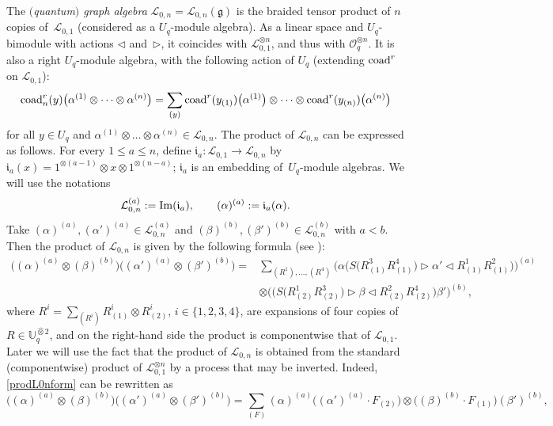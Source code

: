 \documentclass[10pt,a4paper]{amsart}
\numberwithin{equation}{section}
\theoremstyle{definition}
\newcommand{\mUq}{\mathbb{U}_q}
\newcommand{\Ll}{{\mathcal L}}
\newcommand{\Oo}{{\mathcal O}}
\newcommand{\ra}{\rightarrow}
\begin{document}
The {\it $($quantum$)$ graph algebra} $\Ll_{0,n} = \Ll_{0,n}(\mathfrak{g})$ is the braided tensor product of $n$ copies of~$\Ll_{0,1}$ (considered as a $U_q$-module algebra). As a linear space and $U_q$-bimodule with actions $\lhd$ and~$\rhd$, it coincides with $\Ll_{0,1}^{\otimes n}$, and thus with $\Oo_q^{\otimes n}$. It is also a right $U_q$-module algebra, with the following action of $U_q$ (extending ${\rm coad}^r$ on $\Ll_{0,1}$):
 \begin{gather}
{\rm coad}_n^r(y)\big(\alpha^{(1)}\otimes \dots \otimes \alpha^{(n)}\big) =
\sum_{(y)} {\rm coad}^r(y_{(1)})\big(\alpha^{(1)}\big) \otimes \dots \otimes {\rm coad}^r(y_{(n)})\big(\alpha^{(n)}\big)\label{actionprod}
\end{gather}
for all $y \in U_q$ and $\alpha^{(1)}\otimes \dots \otimes \alpha^{(n)} \in \Ll_{0,n}$. The product of $\Ll_{0,n}$ can be expressed as follows. For every $1\leq a\leq n$, define $\mathfrak{i}_a\colon \Ll_{0,1}\ra \Ll_{0,n}$ by $\mathfrak{i}_a(x) = 1^{\otimes (a-1)}\otimes x \otimes 1^{\otimes (n-a)}$; $\mathfrak{i}_a$ is an embedding of~$U_q$-module algebras. We will use the notations
\begin{equation}\label{plgtL01a}
\Ll_{0,n}^{(a)}:= {\rm Im}(\mathfrak{i}_a),\qquad (\alpha)^{(a)} := \mathfrak{i}_a(\alpha).
\end{equation}
Take $(\alpha)^{(a)},(\alpha')^{(a)} \in \Ll_{0,n}^{(a)}$ and $(\beta)^{(b)},(\beta')^{(b)} \in \Ll_{0,n}^{(b)}$ with $a<b$. Then the product of $\Ll_{0,n}$ is given by the following formula (see \cite[Section 6]{BR}):
\begin{align}
\big((\alpha)^{(a)}\otimes (\beta)^{(b)}\big) \big((\alpha')^{(a)} \otimes (\beta')^{(b)}\big) ={}& \sum_{(R^1),\dots, (R^4)} \big(\alpha \big(S\big(R^3_{(1)}R^4_{(1)}\big)\rhd \alpha' \lhd R^1_{(1)}R^2_{(1)}\big)\big)^{(a)}\nonumber\\
 &
\otimes \big( \big( S\big(R^1_{(2)}R^3_{(2)}\big) \rhd \beta \lhd R^2_{(2)}R^4_{(2)}\big)\beta'\big)^{(b)},\label{prodL0nform}
\end{align}
where $R^i = \sum_{(R^i)}R_{(1)}^i\otimes R_{(2)}^i$, $i\in \{1,2,3,4\}$, are expansions of four copies of $R\in \mUq^{\hat \otimes 2}$, and on the right-hand side the product is componentwise that of $\Ll_{0,1}$. Later we will use the fact that the product of $\Ll_{0,n}$ is obtained from the standard (componentwise) product of $\Ll_{0,1}^{\otimes n}$ by a process that may be inverted. Indeed, \eqref{prodL0nform} can be rewritten as
\begin{equation}\label{prodL0nform2}
\big((\alpha)^{(a)}\otimes (\beta)^{(b)}\big) \big((\alpha')^{(a)} \otimes (\beta')^{(b)}\big) = \sum_{(F)} (\alpha)^{(a)}\big((\alpha')^{(a)}\cdot F_{(2)}\big)\otimes \big((\beta)^{(b)}\cdot F_{(1)}\big)(\beta')^{(b)},
\end{equation}
\end{document}
